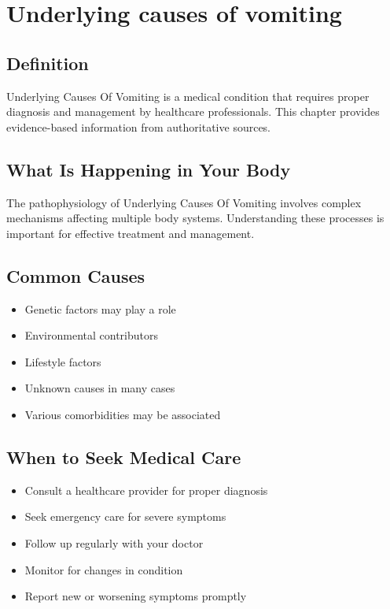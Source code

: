 
\chapter{Underlying causes of vomiting}

\section*{Definition}
Underlying Causes Of Vomiting is a medical condition that requires proper diagnosis and management by healthcare professionals. This chapter provides evidence-based information from authoritative sources.

\section*{What Is Happening in Your Body}
The pathophysiology of Underlying Causes Of Vomiting involves complex mechanisms affecting multiple body systems. Understanding these processes is important for effective treatment and management.

\section*{Common Causes}
\begin{itemize}
  \item Genetic factors may play a role
  \item Environmental contributors
  \item Lifestyle factors
  \item Unknown causes in many cases
  \item Various comorbidities may be associated
\end{itemize}

\section*{When to Seek Medical Care}
\begin{itemize}
  \item Consult a healthcare provider for proper diagnosis
  \item Seek emergency care for severe symptoms
  \item Follow up regularly with your doctor
  \item Monitor for changes in condition
  \item Report new or worsening symptoms promptly
\end{itemize}

